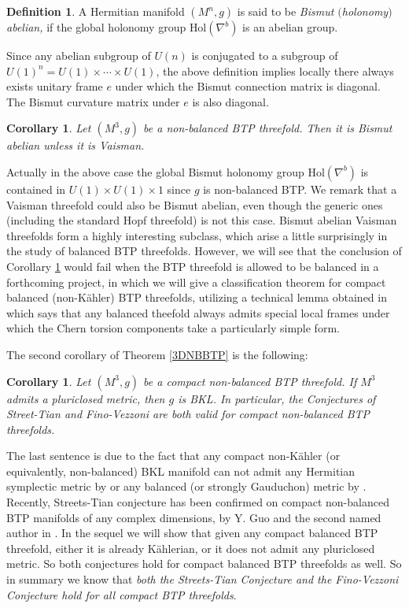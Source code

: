 \documentclass{amsart}
\numberwithin{equation}{section}
\newtheorem{corollary}  [theorem]     {Corollary}
\theoremstyle{definition}
\newtheorem{definition}  [theorem]     {Definition}
\renewcommand{\1}{\mathds{1}}
\renewcommand{\>}{\rightarrow}
\begin{document}
\begin{definition}
A Hermitian manifold $(M^n,g)$ is said to be {\em Bismut $($holonomy$)$ abelian,}
if the global holonomy group $\mbox{Hol}(\nabla^b)$ is an abelian group.
\end{definition}

Since any abelian subgroup of $U(n)$ is conjugated to a subgroup of $U(1)^n=U(1)\times \cdots \times U(1)$, the above definition implies locally there always exists unitary frame $e$ under which the Bismut connection matrix is diagonal. The Bismut curvature matrix under $e$ is also diagonal.

\begin{corollary} \label{cor1.16}
Let $(M^3,g)$ be a non-balanced BTP threefold. Then it is Bismut abelian unless it is Vaisman.
\end{corollary}

Actually in the above case the global Bismut holonomy group $\mbox{Hol}(\nabla^b)$ is contained in $U(1)\times U(1)\times 1$ since $g$ is non-balanced BTP. We remark that a Vaisman threefold could also be Bismut abelian, even though the generic ones (including the standard Hopf threefold) is not this case. Bismut abelian Vaisman threefolds \cite[Subsection 5.3]{ZhaoZ25} form a highly interesting subclass, which arise a little surprisingly in the study of balanced BTP threefolds. However, we will see that the conclusion of Corollary \ref{cor1.16} would fail when the BTP threefold is allowed to be balanced in a forthcoming project, in which we will give a classification theorem for compact balanced (non-K\"ahler) BTP threefolds, utilizing a technical lemma obtained in \cite{ZhouZ} which says that any balanced theefold always admits special local frames under which the Chern torsion components take a particularly simple form.

The second corollary of Theorem \ref{3DNBBTP} is the following:

\begin{corollary} \label{cor1.17}
Let $(M^3,g)$ be a compact non-balanced BTP threefold. If $M^3$ admits a pluriclosed metric, then $g$ is BKL.
In particular, the Conjectures of Street-Tian and Fino-Vezzoni are both valid for compact non-balanced BTP threefolds.
\end{corollary}

The last sentence is due to the fact that any compact non-K\"ahler (or equivalently, non-balanced) BKL manifold can not admit any Hermitian symplectic metric by \cite[Theorem 1]{YZZ} or any balanced (or strongly Gauduchon) metric by \cite[Theorem 3]{ZhaoZ19Str}. Recently,
Streets-Tian conjecture has been confirmed on compact non-balanced BTP manifolds of any complex dimensions, by Y. Guo and
the second named author in \cite{GZ}. In the sequel we will show that given any compact balanced BTP threefold, either it is already K\"ahlerian, or it does not admit any pluriclosed metric. So both conjectures hold for compact balanced BTP threefolds as well.
So in summary we know that {\em both the Streets-Tian Conjecture and the Fino-Vezzoni Conjecture hold for all compact BTP threefolds}.
\end{document}

